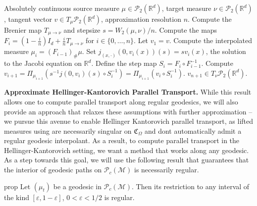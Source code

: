 \documentclass[11pt]{article}
\newcommand{\man}{\mathcal{M}}
\begin{document}
\begin{algorithm}[H]
    \begin{algorithmic}[1]
        \caption{Approximate Parallel transport on $(\mathcal{P}_{2}(\mathbb{R}^d), W_2)$}
        \label{alg: W parallel transport}
        \Require Absolutely continuous source measure $\mu \in \mathcal{P}_{2}(\mathbb{R}^d)$, target measure $\nu \in \mathcal{P}_{2}(\mathbb{R}^d)$, tangent vector $v \in T_{\mu}\mathcal{P}_{2}(\mathbb{R}^d)$, approximation resolution $n$.  
        \State Compute the Brenier map $T_{\mu \rightarrow \nu}$ and stepsize $s = W_2(\mu, \nu)/n.$
        \State Compute the maps $F_i = (1 - \frac{i}{n})I_d + \frac{i}{n}T_{\mu \rightarrow \nu}$ for $i \in \{0, \dots, n\}$.
        \State Let $v_1 = v$.
            \State Compute the interpolated measure $\mu_i = (F_{i-1})_\#\mu$.
            \State Set $j_{(x, \cdot)}(0, v_i(x))(s) = sv_i(x)$, the solution to the Jacobi equation on $\mathbb{R}^d$.
            \State Define the step map $S_i = F_i \circ F_{i -1}^{-1}.$
            \State Compute $v_{i+1} = \Pi_{\mu_{i+1}}\left(s^{-1}j(0, v_i)(s) \circ S_i^{-1}\right) = \Pi_{\mu_{i + 1}}(v_i \circ S_i^{-1})$. 
        \EndFor
        \State \Return $v_{n+1} \in T_\nu \mathcal{P}_{2}(\mathbb{R}^d)$. 
    \end{algorithmic}
\end{algorithm} 

\noindent \textbf{Approximate Hellinger-Kantorovich Parallel Transport.} While this result allows one to compute parallel transport along regular geodesics, we will also provide an approach that relaxes these assumptions with further approximation -- we pursue this avenue to enable Hellinger Kantorovich parallel transport, as lifted measures using  are necessarily singular on $\mathfrak{C}_{\Omega}$ and dont automatically admit a regular geodesic interpolant. As a result, to compute parallel transport in the Hellinger-Kantorovich setting, we want a method that works along any geodesic. As a step towards this goal, we will use the following result that guarantees that the interior of geodesic paths on $\mathcal{P}_c(\man)$ is necessarily regular.

\begin{restatable}{prop}{} \label{geodesic restriction}
    Let $(\mu_t)$ be a geodesic in $\mathcal{P}_c(\man)$. Then its restriction to any interval of the kind $[\varepsilon, 1-\varepsilon]$, $0 < \varepsilon< 1/2$ is regular.
\end{restatable}
\end{document}
